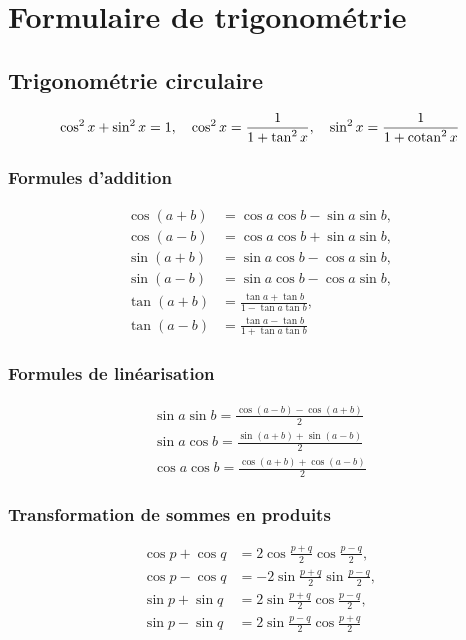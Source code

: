 \chapter{Formulaire de trigonométrie}
\section{Trigonométrie circulaire}
\begin{equation}
  \cos^2x+\sin^2x = 1, \quad \cos^2x=\frac{1}{1+\tan^2x}, \quad \sin^2x=\frac{1}{1+\operatorname{cotan}^2x}
\end{equation}
\subsection{Formules d'addition}
\begin{align}
  \cos(a+b)&=\cos a \cos b -\sin a \sin b, \\   \cos(a-b)&=\cos a \cos b +\sin a \sin b, \\
  \sin(a+b)&=\sin a \cos b -\cos a \sin b, \\  \sin(a-b)&=\sin a \cos b -\cos a \sin b, \\
  \tan(a+b)&=\frac{\tan a+ \tan b}{1-\tan a \tan b}, \\   \tan(a-b)&=\frac{\tan a - \tan b}{1+\tan a \tan b}
\end{align}
\subsection{Formules de linéarisation}
\begin{align}
  \sin a \sin b = \frac{\cos(a-b)-\cos(a+b)}{2} \\
  \sin a \cos b = \frac{\sin(a+b)+\sin(a-b)}{2} \\
  \cos a \cos b = \frac{\cos(a+b)+\cos(a-b)}{2} 
\end{align}
\subsection{Transformation de sommes en produits}
\begin{align}
  \cos p + \cos q &= 2 \cos \frac{p+q}{2} \cos \frac{p-q}{2}, \\ \cos p - \cos q &= -2 \sin \frac{p+q}{2} \sin \frac{p-q}{2},\\
  \sin p + \sin q &= 2 \sin \frac{p+q}{2} \cos \frac{p-q}{2}, \\ \sin p - \sin q &= 2 \sin \frac{p-q}{2} \cos \frac{p+q}{2}
\end{align}
